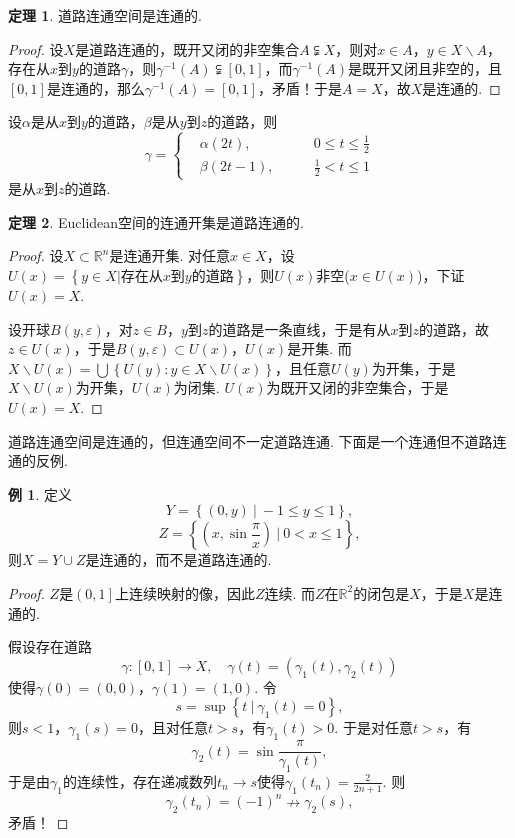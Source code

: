 \documentclass[12pt]{ctexart}
\theoremstyle{definition}
\newtheorem{theorem}{定理}
\newtheorem{example}{例}
\theoremstyle{plain}
\begin{document}
	\begin{theorem}
		道路连通空间是连通的.
	\end{theorem}
	\begin{proof}
		设$X$是道路连通的，既开又闭的非空集合$A\subsetneqq X$，则对$x\in A$，$y\in X\backslash A$，存在从$x$到$y$的道路$\gamma$，则$\gamma^{-1}(A)\subsetneqq\left[0,1\right]$，而$\gamma^{-1}(A)$是既开又闭且非空的，且$\left[0,1\right]$是连通的，那么$\gamma^{-1}(A)=\left[0,1\right]$，矛盾！于是$A=X$，故$X$是连通的.
	\end{proof}
	设$\alpha$是从$x$到$y$的道路，$\beta$是从$y$到$z$的道路，则
	\begin{equation*}
		\gamma=\left\{
		\begin{aligned}
			&\alpha(2t),\qquad &0\leqslant t\leqslant\frac{1}{2}\\
			&\beta(2t-1),\qquad &\frac{1}{2}<t\leqslant 1
		\end{aligned}
		\right.
	\end{equation*}
	是从$x$到$z$的道路.
	\begin{theorem}
		Euclidean空间的连通开集是道路连通的.
	\end{theorem}
	\begin{proof}
		设$X\subset\mathbb{R}^n$是连通开集. 对任意$x\in X$，设$U(x)=\left\{y\in X|\text{存在从}x\text{到}y\text{的道路}\right\}$，则$U(x)$非空($x\in U(x)$)，下证$U(x)=X$.
		
		设开球$B(y,\varepsilon)$，对$z\in B$，$y$到$z$的道路是一条直线，于是有从$x$到$z$的道路，故$z\in U(x)$，于是$B(y,\varepsilon)\subset U(x)$，$U(x)$是开集. 而$X\backslash U(x)=\bigcup\left\{U(y):y\in X\backslash U(x)\right\}$，且任意$U(y)$为开集，于是$X\backslash U(x)$为开集，$U(x)$为闭集. $U(x)$为既开又闭的非空集合，于是$U(x)=X$.
	\end{proof}
	道路连通空间是连通的，但连通空间不一定道路连通. 下面是一个连通但不道路连通的反例.
	\begin{example}
		定义
		$$Y=\left\{(0,y)\ |\ -1\leqslant y\leqslant 1\right\},$$
		$$Z=\left\{(x,\sin\frac{\pi}{x})\ | \ 0<x\leqslant 1\right\},$$
		则$X=Y\cup Z$是连通的，而不是道路连通的.
	\end{example}
	\begin{proof}
		$Z$是$\left(0,1\right]$上连续映射的像，因此$Z$连续. 而$Z$在$\mathbb{R}^2$的闭包是$X$，于是$X$是连通的.
		
		假设存在道路
		$$\gamma:\left[0,1\right]\to X,\quad \gamma(t)=(\gamma_1(t),\gamma_2(t))$$
		使得$\gamma(0)=(0,0)$，$\gamma(1)=(1,0)$. 令
		$$s=\sup\left\{t\ |\ \gamma_1(t)=0\right\},$$
		则$s<1$，$\gamma_1(s)=0$，且对任意$t>s$，有$\gamma_1(t)>0$. 于是对任意$t>s$，有
		$$\gamma_2(t)=\sin\frac{\pi}{\gamma_1(t)},$$
		于是由$\gamma_1$的连续性，存在递减数列$t_n\to s$使得$\gamma_1(t_n)=\frac{2}{2n+1}$. 则
		$$\gamma_2(t_n)=(-1)^n\nrightarrow \gamma_2(s),$$
		矛盾！
	\end{proof}
\end{document}
